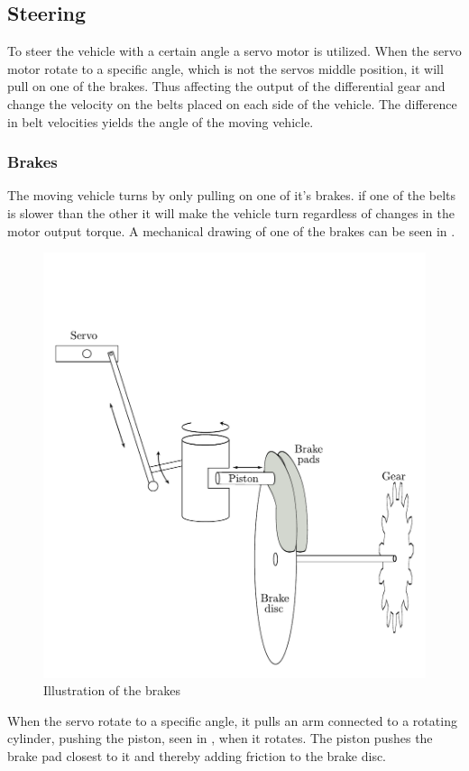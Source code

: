 \subsection{Steering}
To steer the vehicle with a certain angle a servo motor is utilized. When the servo motor rotate to a specific angle, which is not the servos middle position, it will pull on one of the brakes. Thus affecting the output of the differential gear and change the velocity on the belts placed on each side of the vehicle. The difference in belt velocities yields the angle of the moving vehicle.

\subsubsection{Brakes}
The moving vehicle turns by only pulling on one of it's brakes. if one of the belts is slower than the other it will make the vehicle turn regardless of changes in the motor output torque. A mechanical drawing of one of the brakes can be seen in . 

 \begin{figure}[H]
	\centering
	\includegraphics[scale=0.6]{figures/brakeDescription.pdf}
	\caption{Illustration of the brakes}
	\label{Brakes}
\end{figure}

When the servo rotate to a specific angle, it pulls an arm connected to a rotating cylinder, pushing the piston, seen in , when it rotates. The piston pushes the brake pad closest to it and thereby adding friction to the brake disc.

